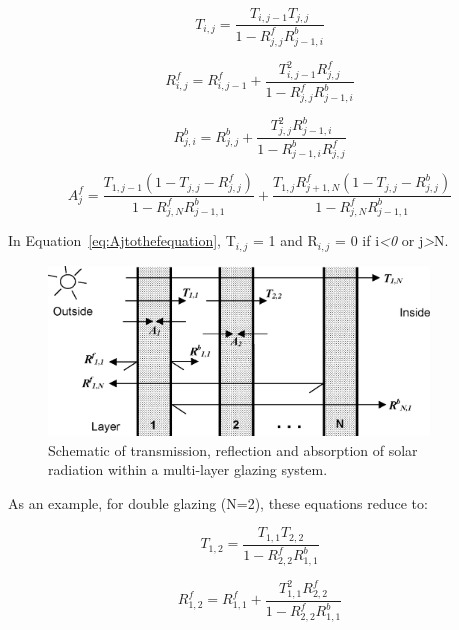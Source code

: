 \begin{equation}
{T_{i,j}} = \frac{{{T_{i,j - 1}}{T_{j,j}}}}{{1 - R_{j,j}^fR_{j - 1,i}^b}}
\label{eq:Tijequation}
\end{equation}

\begin{equation}
R_{i,j}^f = R_{i,j - 1}^f + \frac{{T_{i,j - 1}^2R_{j,j}^f}}{{1 - R_{j,j}^fR_{j - 1,i}^b}}
\end{equation}

\begin{equation}
R_{j,i}^b = R_{j,j}^b + \frac{{T_{j,j}^2R_{j - 1,i}^b}}{{1 - R_{j - 1,i}^bR_{j,j}^f}}
\end{equation}

\begin{equation}
A_j^f = \frac{{{T_{1,j - 1}}(1 - {T_{j,j}} - R_{j,j}^f)}}{{1 - R_{j,N}^fR_{j - 1,1}^b}} + \frac{{{T_{1,j}}R_{j + 1,N}^f(1 - {T_{j,j}} - R_{j,j}^b)}}{{1 - R_{j,N}^fR_{j - 1,1}^b}}
\label{eq:Ajtothefequation}
\end{equation}

In Equation~\ref{eq:Ajtothefequation}, {T\(_{i,j}\)} = 1 and {R\(_{i,j}\)} = 0 if i\emph{\textless{}0} or j\emph{\textgreater{}}N.

\begin{figure}[hbtp] %
\centering
\includegraphics[width=0.9\textwidth, height=0.9\textheight, keepaspectratio=true]{media/image956.png}
\caption{Schematic of transmission, reflection and absorption of solar radiation within a multi-layer glazing system. \protect \label{fig:schematic-of-transmission-reflection}}
\end{figure}

As an example, for double glazing (N=2), these equations reduce to:

\begin{equation}
{T_{1,2}} = \frac{{{T_{1,1}}{T_{2,2}}}}{{1 - R_{2,2}^fR_{1,1}^b}}
\end{equation}

\begin{equation}
R_{1,2}^f = R_{1,1}^f + \frac{{T_{1,1}^2R_{2,2}^f}}{{1 - R_{2,2}^fR_{1,1}^b}}
\end{equation}


